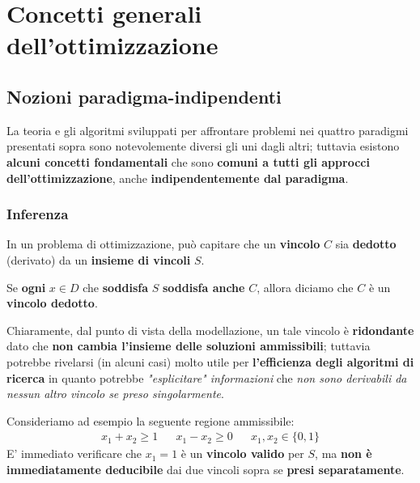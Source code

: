 
\chapter{Concetti generali dell'ottimizzazione}

\section{Nozioni paradigma-indipendenti}

La teoria e gli algoritmi sviluppati per affrontare problemi nei quattro paradigmi presentati
sopra sono notevolemente diversi gli uni dagli altri; tuttavia esistono \textbf{alcuni concetti 
fondamentali} che sono \textbf{comuni a tutti gli approcci dell'ottimizzazione}, anche 
\textbf{indipendentemente dal paradigma}. 

\subsection{Inferenza}

In un problema di ottimizzazione, può capitare che un \textbf{vincolo} $C$ sia
\textbf{dedotto} (derivato) da un \textbf{insieme di vincoli} $S$.

\begin{definition}
    Se \textbf{ogni} $x\in D$ che \textbf{soddisfa} $S$ \textbf{soddisfa
    anche} $C$, allora diciamo che $C$ è un \textbf{vincolo dedotto}.
\end{definition}

Chiaramente, dal punto di vista della modellazione, un tale vincolo è \textbf{ridondante}
dato che \textbf{non cambia l'insieme delle soluzioni ammissibili}; tuttavia potrebbe
rivelarsi (in alcuni casi) molto utile per \textbf{l'efficienza degli algoritmi di 
ricerca} in quanto potrebbe \textit{"esplicitare" informazioni} che \textit{non sono
derivabili da nessun altro vincolo se preso singolarmente}.

\begin{exa}
    Consideriamo ad esempio la seguente regione ammissibile:
    \[
        \begin{aligned}
            x_{1} + x_{2} \ge 1 & & x_{1}-x_{2} \ge 0 & & x_{1},x_{2} \in \{0,1\}  
        \end{aligned}
    \]
    E' immediato verificare che $x_{1}=1$ è un \textbf{vincolo valido} per $S$, ma
    \textbf{non è immediatamente deducibile} dai due vincoli sopra se 
    \textbf{presi separatamente}.
\end{exa}

